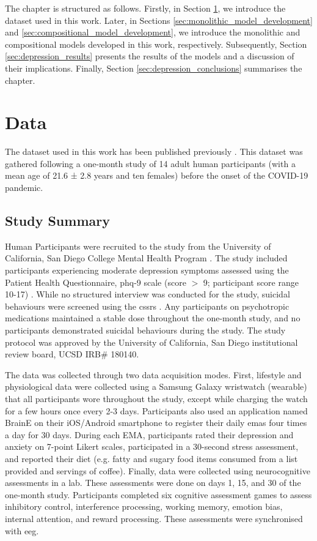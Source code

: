 The chapter is structured as follows. Firstly, in Section \ref{sec:depression_data}, we introduce the dataset used in this work. Later, in Sections \ref{sec:monolithic_model_development} and \ref{sec:compositional_model_development}, we introduce the monolithic and compositional models developed in this work, respectively. Subsequently, Section \ref{sec:depression_results} presents the results of the models and a discussion of their implications. Finally, Section \ref{sec:depression_conclusions} summarises the chapter.




\section{Data}
\label{sec:depression_data}

The dataset used in this work has been published previously \cite{shah_personalized_2021}. This dataset was gathered following a one-month study of 14 adult human participants (with a mean age of 21.6 ± 2.8 years and ten females) before the onset of the COVID-19 pandemic. 

\subsection{Study Summary}
\label{sec:study_summary}

Human Participants were recruited to the study from the University of California, San Diego College Mental Health Program \cite{downs_implementing_2019}. The study included participants experiencing moderate depression symptoms assessed using the Patient Health Questionnaire, \gls{phq}-9 scale (score $>$ 9; participant score range 10-17) \cite{kroenke_phq-9_2001}. While no structured interview was conducted for the study, suicidal behaviours were screened using the \gls{cssrs} \cite{oquendo_risk_2003}. Any participants on psychotropic medications maintained a stable dose throughout the one-month study, and no participants demonstrated suicidal behaviours during the study. The study protocol was approved by the University of California, San Diego institutional review board, UCSD IRB\# 180140.

The data was collected through two data acquisition modes. First, lifestyle and physiological data were collected using a Samsung Galaxy wristwatch (wearable) that all participants wore throughout the study, except while charging the watch for a few hours once every 2-3 days. Participants also used an application named BrainE on their iOS/Android smartphone \cite{balasubramani_mapping_2021} to register their daily \glspl{ema} four times a day for 30 days. During each EMA, participants rated their depression and anxiety on 7-point Likert scales, participated in a 30-second stress assessment, and reported their diet (e.g. fatty and sugary food items consumed from a list provided and servings of coffee). Finally, data were collected using neurocognitive assessments in a lab. These assessments were done on days 1, 15, and 30 of the one-month study. Participants completed six cognitive assessment games to assess inhibitory control, interference processing, working memory, emotion bias, internal attention, and reward processing. These assessments were synchronised with \gls{eeg}.


